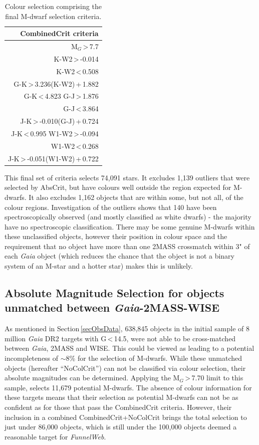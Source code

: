 \begin{table}
    \centering
    \begin{tabular}{|r|}
        \hline
        CombinedCrit criteria\\
        \hline
    	M$_G$\,\textgreater\,7.7\\
        K-W2\,\textgreater\,-0.014\\
        K-W2\,\textless\,0.508\\
        G-K\,\textgreater\,3.236(K-W2)\,+\,1.882\\
        G-K\,\textless\,4.823
        G-J\,\textgreater\,1.876\\
        G-J\,\textless\,3.864\\
        J-K\,\textgreater\,-0.010(G-J)\,+\,0.724\\
        J-K\,\textless\,0.995
        W1-W2\,\textgreater\,-0.094\\
        W1-W2\,\textless\,0.268\\
        J-K\,\textgreater\,-0.051(W1-W2)\,+\,0.722\\
        \hline
    \end{tabular}
    \caption{Colour selection comprising the final M-dwarf selection criteria.}
    \label{eqFin}
\end{table}

This final set of criteria selects 74,091 stars. It excludes 1,139 outliers that were selected by AbsCrit, but have colours well outside the region expected for M-dwarfs. It also excludes 1,162 objects that are within some, but not all, of the colour regions. Investigation of the outliers shows that 140 have been spectroscopically observed (and mostly classified as white dwarfs) - the majority have no spectroscopic classification. There may be some genuine M-dwarfs within these unclassified objects, however their position in colour space and the requirement that no object have more than one 2MASS crossmatch within 3" of each {\em Gaia} object (which reduces the chance that the object is not a binary system of an M-star and a hotter star) makes this is unlikely.
\subsection{Absolute Magnitude Selection for objects unmatched between {\em Gaia}-2MASS-WISE}
\label{secExcl}
As mentioned in Section\,\ref{secObsData}, 638,845 objects in the initial sample of 8 million {\em Gaia} DR2 targets with G\,\textless\,14.5, were not able to be cross-matched between {\em Gaia}, 2MASS and WISE. This could be viewed as leading to a potential incompleteness of $\sim$8\% for the selection of M-dwarfs. While these unmatched objects (hereafter ``NoColCrit'') can not be classified via colour selection, their absolute magnitudes can be determined. Applying the M$_G$\,\textgreater\,7.70 limit to this sample, selects 11,679 potential M-dwarfs. The absence of colour information for these targets means that their selection as potential M-dwarfs can not be as confident as for those that pass the CombinedCrit criteria. However, their inclusion in a combined CombinedCrit+NoColCrit brings the total selection to just under 86,000 objects, which is still under the 100,000 objects deemed a reasonable target for {\em FunnelWeb}.

